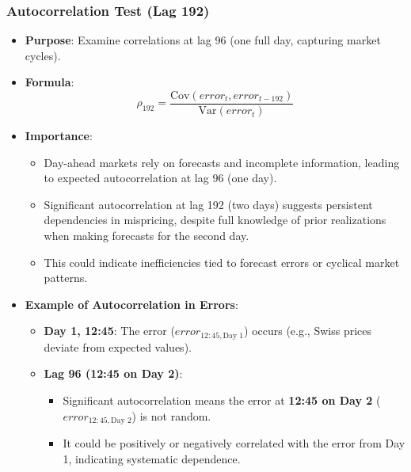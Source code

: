 \documentclass[12pt]{article}
\begin{document}
\subsubsection {Autocorrelation Test (Lag 192)}
\begin{itemize}
    \item \textbf{Purpose}: Examine correlations at lag 96 (one full day, capturing market cycles).

    \item \textbf{Formula}:
    \[
    \rho_{192} = \frac{\text{Cov}(error_t, error_{t-192})}{\text{Var}(error_t)}
    \]

    \item \textbf{Importance}:
    \begin{itemize}
        \item Day-ahead markets rely on forecasts and incomplete information, leading to expected autocorrelation at lag 96 (one day).
        \item Significant autocorrelation at lag 192 (two days) suggests persistent dependencies in mispricing, despite full knowledge of prior realizations when making forecasts for the second day.
        \item This could indicate inefficiencies tied to forecast errors or cyclical market patterns.
    \end{itemize}

    \item \textbf{Example of Autocorrelation in Errors}:
    \begin{itemize}
        \item \textbf{Day 1, 12:45}: The error ($error_{12:45, \text{Day 1}}$) occurs (e.g., Swiss prices deviate from expected values).
        \item \textbf{Lag 96 (12:45 on Day 2)}:
        \begin{itemize}
            \item Significant autocorrelation means the error at \textbf{12:45 on Day 2} ($error_{12:45, \text{Day 2}}$) is not random.
            \item It could be positively or negatively correlated with the error from Day 1, indicating systematic dependence.
        \end{itemize}
    \end{itemize}
\end{itemize}
\end{document}
